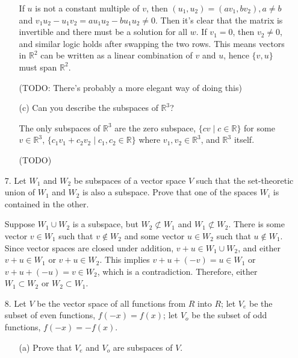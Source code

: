\documentclass{article}
\begin{document}
\begin{enumerate}[listparindent=\parindent]
\begin{enumerate}[listparindent=\parindent]
            If \(u\) is not a constant multiple of \(v\),
            then \((u_1, u_2) = (av_1, bv_2), a \neq b\) and \(v_1u_2 - u_1v_2 = au_1u_2 - bu_1u_2 \neq 0\).
            Then it's clear that the matrix is invertible and there must be a solution for all \(w\).
            If \(v_1 = 0\), then \(v_2 \neq 0\), and similar logic holds after swapping the two rows.
            This means vectors in \(\mathbb{R}^2\) can be written as a linear combination of \(v\) and \(u\),
            hence \(\{v, u\}\) must span \(\mathbb{R}^2\).

            (TODO: There's probably a more elegant way of doing this)

        \item[(c)] Can you describe the subspaces of \(\mathbb{R}^3\)?

            The only subspaces of \(\mathbb{R}^3\) are the zero subspace, \(\{cv \mid c \in \mathbb{R}\}\) for some \(v \in \mathbb{R}^3\),
            \(\{c_1v_1 + c_2v_2 \mid c_1, c_2 \in \mathbb{R}\}\) where \(v_1, v_2 \in \mathbb{R}^3\), and \(\mathbb{R}^3\) itself.

            (TODO)
    \end{enumerate}

\item[7.] Let \(W_1\) and \(W_2\) be subspaces of a vector space \(V\) such that the set-theoretic union of \(W_1\) and \(W_2\) is also a subspace.
    Prove that one of the spaces \(W_i\) is contained in the other.

    Suppose \(W_1 \cup W_2\) is a subspace, but \(W_2 \not\subset W_1\) and \(W_1 \not\subset W_2\).
    There is some vector \(v \in W_1\) such that \(v \not\in W_2\) and
    some vector \(u \in W_2\) such that \(u \not\in W_1\).
    Since vector spaces are closed under addition, \(v + u \in W_1 \cup W_2\), and either \(v + u \in W_1\) or \(v + u \in W_2\).
    This implies \(v + u + (-v) = u \in W_1\) or \(v + u + (-u) = v \in W_2\), which is a contradiction.
    Therefore, either \(W_1 \subset W_2\) or \(W_2 \subset W_1\).

\item[8.] Let \(V\) be the vector space of all functions from \(R\) into \(R\);
    let \(V_e\) be the subset of even functions, \(f(-x) = f(x)\);
    let \(V_o\) be the subset of odd functions, \(f(-x) = -f(x)\).

    \begin{enumerate}[listparindent=\parindent]
        \item[(a)] Prove that \(V_e\) and \(V_o\) are subspaces of \(V\).


\end{enumerate}
\end{enumerate}
\end{document}
